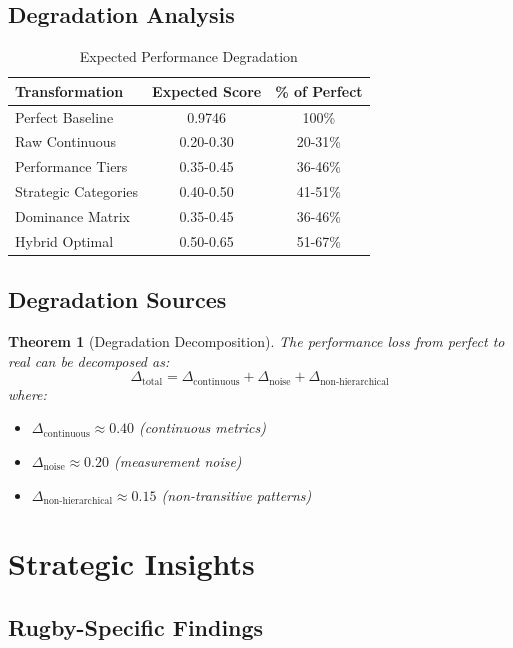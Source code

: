 \documentclass[11pt,a4paper]{article}
\newtheorem{theorem}{Theorem}
\begin{document}
\subsection{Degradation Analysis}

\begin{table}[h]
\centering
\caption{Expected Performance Degradation}
\begin{tabular}{lcc}
\toprule
\textbf{Transformation} & \textbf{Expected Score} & \textbf{\% of Perfect} \\
\midrule
Perfect Baseline & 0.9746 & 100\% \\
Raw Continuous & 0.20-0.30 & 20-31\% \\
Performance Tiers & 0.35-0.45 & 36-46\% \\
Strategic Categories & 0.40-0.50 & 41-51\% \\
Dominance Matrix & 0.35-0.45 & 36-46\% \\
Hybrid Optimal & 0.50-0.65 & 51-67\% \\
\bottomrule
\end{tabular}
\end{table}

\subsection{Degradation Sources}

\begin{theorem}[Degradation Decomposition]
The performance loss from perfect to real can be decomposed as:
\[
\Delta_{\text{total}} = \Delta_{\text{continuous}} + \Delta_{\text{noise}} + \Delta_{\text{non-hierarchical}}
\]
where:
\begin{itemize}
    \item $\Delta_{\text{continuous}} \approx 0.40$ (continuous metrics)
    \item $\Delta_{\text{noise}} \approx 0.20$ (measurement noise)
    \item $\Delta_{\text{non-hierarchical}} \approx 0.15$ (non-transitive patterns)
\end{itemize}
\end{theorem}

\section{Strategic Insights}

\subsection{Rugby-Specific Findings}
\end{document}
